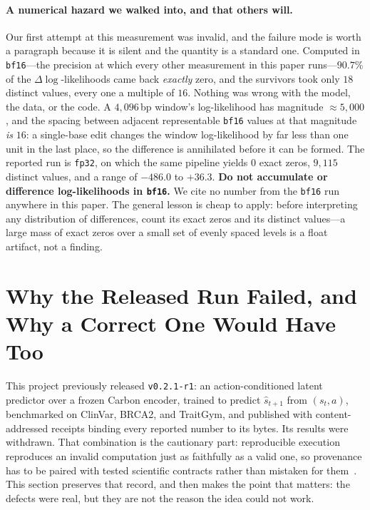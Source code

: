 \documentclass{article}
\begin{document}
\paragraph{A numerical hazard we walked into, and that others will.} Our first attempt at this
measurement was invalid, and the failure mode is worth a paragraph because it is silent and the
quantity is a standard one. Computed in \texttt{bf16}---the precision at which every other
measurement in this paper runs---$90.7\%$ of the $\Delta\log$-likelihoods came back \emph{exactly}
zero, and the survivors took only $18$ distinct values, every one a multiple of $16$. Nothing was
wrong with the model, the data, or the code. A $4{,}096$\,bp window's log-likelihood has magnitude
$\approx5{,}000$, and the spacing between adjacent representable \texttt{bf16} values at that
magnitude \emph{is} $16$: a single-base edit changes the window log-likelihood by far less than one
unit in the last place, so the difference is annihilated before it can be formed. The reported run
is \texttt{fp32}, on which the same pipeline yields $0$ exact zeros, $9{,}115$ distinct values, and
a range of $-486.0$ to $+36.3$. \textbf{Do not accumulate or difference log-likelihoods in
\texttt{bf16}.} We cite no number from the \texttt{bf16} run anywhere in this paper. The general
lesson is cheap to apply: before interpreting any distribution of differences, count its exact zeros
and its distinct values---a large mass of exact zeros over a small set of evenly spaced levels is a
float artifact, not a finding.

\section{Why the Released Run Failed, and Why a Correct One Would Have Too}
\label{sec:retraction}

This project previously released \texttt{v0.2.1-r1}: an action-conditioned latent predictor over a
frozen Carbon encoder, trained to predict $\hat s_{t+1}$ from $(s_t,a)$, benchmarked on ClinVar,
BRCA2, and TraitGym, and published with content-addressed receipts binding every reported number to
its bytes. Its results were withdrawn. That combination is the cautionary part: reproducible
execution reproduces an invalid computation just as faithfully as a valid one, so provenance has to
be paired with tested scientific contracts rather than mistaken for them~\citep{reproducibility2021}.
This section preserves that record, and then makes the point that matters: the defects were real,
but they are not the reason the idea could not work.
\end{document}
